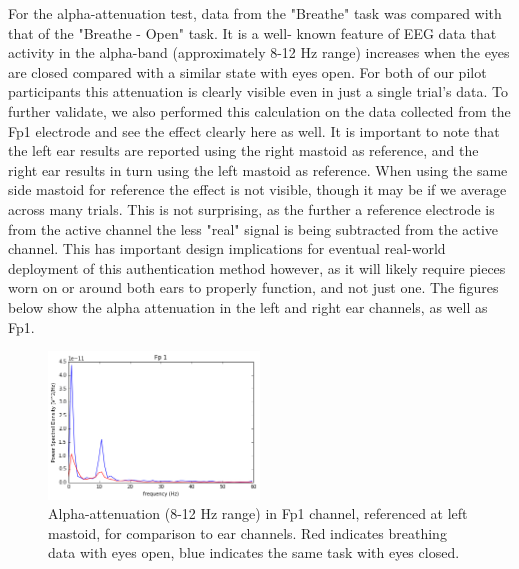 \documentclass[11pt]{article}
\begin{document}
For the alpha-attenuation test, data from the "Breathe" task was compared with that of the "Breathe - Open" task. It is a well-
known feature of EEG data that activity in the alpha-band (approximately 8-12 Hz range) increases when the eyes are closed
compared with a similar state with eyes open. For both of our pilot participants this attenuation is clearly visible even in just
a single trial's data. To further validate, we also performed this calculation on the data collected from the Fp1 electrode and see
the effect clearly here as well. It is important to note that the left ear results are reported using the right mastoid as reference, and
the right ear results in turn using the left mastoid as reference. When using the same side mastoid for reference the effect is not 
visible, though it may be if we average across many trials. This is not surprising, as the further a reference electrode is from the active
channel the less "real" signal is being subtracted from the active channel. This has important design implications for eventual 
real-world deployment of this authentication method however, as it will likely require pieces worn on or around both ears to properly 
function, and not just one. The figures below show the alpha attenuation in the left and right ear channels, as well as Fp1.


\begin{figure}[h]
\centering
\includegraphics[width=0.5\textwidth]{figures/001_AlphaAtt_Fp1.jpg}
\caption{Alpha-attenuation (8-12 Hz range) in Fp1 channel, referenced at left mastoid, for comparison to ear channels. Red indicates breathing data with
eyes open, blue indicates the same task with eyes closed.}
\end{figure}
\end{document}
